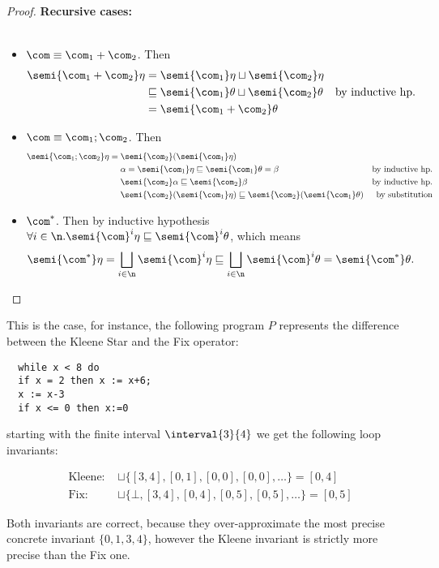 \begin{proof}
  \noindent
  \textbf{Recursive cases:}\ \\ \
  \begin{itemize}
  \item \(\com \equiv \com_1 + \com_2\). Then
    \begin{align*}
      \semi{\com_1 + \com_2}\eta & = \semi{\com_1}\eta \sqcup \semi{\com_2}\eta & \\
      & \sqsubseteq \semi{\com_1}\theta \sqcup \semi{\com_2}\theta & \text{by inductive hp.} \\
      & = \semi{\com_1 + \com_2}\theta
    \end{align*}
  \item \(\com \equiv \com_1 ; \com_2\). Then
    \begin{align*}
      \semi{\com_1;\com_2}\eta = \; & \semi{\com_2}(\semi{\com_1}\eta) & \\
      & \alpha = \semi{\com_1}\eta \sqsubseteq \semi{\com_1}\theta = \beta & \text{by inductive hp.} \\
      & \semi{\com_2}\alpha \sqsubseteq \semi{\com_2}\beta & \text{by inductive hp.} \\
      & \semi{\com_2}(\semi{\com_1}\eta) \sqsubseteq \semi{\com_2}(\semi{\com_1}\theta) & \text{by substitution}
    \end{align*}
  \item \(\com^*\). Then by inductive hypothesis \(\forall i \in \n
    . \semi{\com}^i\eta \sqsubseteq \semi{\com}^i\theta\), which means
    \[\semi{\com^*}\eta = \bigsqcup_{i\in\n}\semi{\com}^i\eta \sqsubseteq
    \bigsqcup_{i\in\n}\semi{\com}^i\theta = \semi{\com^*}\theta.\]
  \end{itemize}
\end{proof}

\begin{example} \label{ex:fix}
  This is the case, for instance, the following program \(P\)
  represents the difference between the Kleene Star and the Fix
  operator:
\begin{verbatim}
  while x < 8 do
  if x = 2 then x := x+6;
  x := x-3
  if x <= 0 then x:=0
\end{verbatim}
starting with the finite interval \(\interval{3}{4}\) we get the
following loop invariants:

\begin{align*}
  \text{Kleene: } &\sqcup\{[3,4], [0,1], [0,0], [0,0], \ldots\} = [0,4]\\[5pt]
  \text{Fix: } & \sqcup\{\bot, [3,4], [0,4], [0,5], [0,5],\ldots\} = [0,5]
\end{align*}

\noindent
Both invariants are correct, because they over-approximate the most
precise concrete invariant \(\{0,1,3,4\}\), however the Kleene
invariant is strictly more precise than the Fix one.
\end{example}

